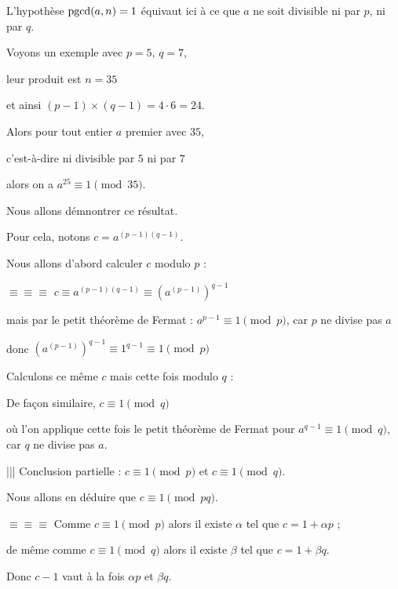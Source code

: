 


\change

L'hypothèse $\mathop{\mathrm{pgcd}}\nolimits(a,n)=1$ équivaut ici à ce que $a$ ne soit divisible ni par $p$, ni par $q$.

\change

Voyons un exemple avec $p=5$, $q=7$, 

leur produit est $n=35$ 

et ainsi $
(p-1)\times(q-1)=4\cdot 6 = 24$.


Alors pour tout entier $a$ premier avec $35$, 

c'est-à-dire ni divisible par $5$ ni par $7$

alors on a  $a^{25} \equiv 1 \pmod{35}$.



\diapo

Nous allons démnontrer ce résultat.

\change
Pour cela, notons $c = a^{(p-1)(q-1)}$.

\change
Nous allons d'abord calculer $c$ modulo $p$ :

$\equiv \equiv \equiv $
$c \equiv a^{(p-1)(q-1)} \equiv (a^{(p-1)})^{q-1}$

mais par le petit théorème de Fermat : $a^{p-1} \equiv 1 \pmod p$, car $p$ ne divise pas $a$

donc 
$(a^{(p-1)})^{q-1} \equiv 1^{q-1} \equiv 1 \pmod{p}$

\change
Calculons ce même $c$ mais cette fois modulo $q$ :

\change
De façon similaire, $c \equiv 1 \pmod{q}$

où l'on applique cette fois le petit théorème de Fermat pour $a^{q-1} \equiv 1 \pmod q$, car $q$ ne divise pas $a$.


|||
Conclusion partielle : $c \equiv 1 \pmod{p}$ et $c \equiv 1 \pmod q$.


\change
Nous allons en déduire que $c \equiv 1 \pmod{pq}$.

\change
$\equiv \equiv \equiv $
Comme $c \equiv 1 \pmod{p}$ alors il existe $\alpha$ tel que $c = 1 + \alpha p$ ;

\change
de même comme $c \equiv 1 \pmod{q}$ alors il existe $\beta$ tel que $c = 1 + \beta q$.

\change
Donc $c-1$ vaut à la fois $\alpha p$ et $\beta q$.

